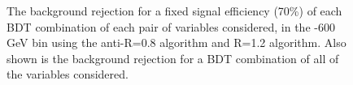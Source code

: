 \begin{figure}
\centering
{}
\caption{The background rejection
for a fixed signal efficiency (70\%) of each BDT combination of
each pair of variables considered, in the -600 GeV bin using the anti-\kT R=0.8
algorithm and R=1.2 algorithm. Also shown is the background rejection
for a BDT combination of all of the variables considered.}
\label{fig:pt500_comb2D}
\end{figure}

